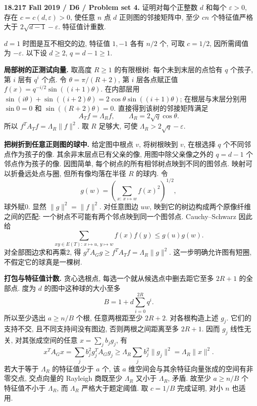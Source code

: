 \begin{exercise}\label{mit:18217-d6}
\textbf{18.217 Fall 2019 / D6 / Problem set 4.}
证明对每个正整数 $d$ 和每个 $\varepsilon>0$, 存在 $c=c(d,\varepsilon)>0$, 使任意 $n$ 点 $d$ 正则图的邻接矩阵中, 至少 $cn$ 个特征值严格大于 $2\sqrt{d-1}-\varepsilon$. 特征值计重数.
\end{exercise}
\begin{solution}
$d=1$ 时图是互不相交的边, 特征值 $1,-1$ 各有 $n/2$ 个, 可取 $c=1/2$, 因所需阈值为 $-\varepsilon$. 以下设 $d\ge2$, $q=d-1\ge1$.

\textbf{局部树的正测试向量.}
取高度 $R\ge1$ 的有限根树: 每个未到末层的点恰有 $q$ 个孩子, 第 $i$ 层有 $q^i$ 个点. 令 $\theta=\pi/(R+2)$, 第 $i$ 层各点赋正值
$f(x)=q^{-i/2}\sin((i+1)\theta)$.
在内部层用
$\sin(i\theta)+\sin((i+2)\theta)=2\cos\theta\sin((i+1)\theta)$;
在根层与末层分别用 $\sin0=0$ 和 $\sin((R+2)\theta)=0$. 直接得到该树的邻接矩阵满足
\[
A_Tf=\Lambda_R f,\qquad \Lambda_R=2\sqrt q\cos\theta.
\]
所以 $f^TA_Tf=\Lambda_R\|f\|^2$. 取 $R$ 足够大, 可使 $\Lambda_R>2\sqrt q-\varepsilon$.

\textbf{把树折到任意正则图的球中.}
给定图中根点 $v$, 将树根映到 $v$, 在根选择 $q$ 个不同邻点作为孩子的像. 其余非末层点已有父亲的像, 用图中除父亲像之外的 $q=d-1$ 个邻点作为孩子的像. 因图简单, 每个树点的所有相邻树点映到不同的图邻点. 映射可以折叠远处点与圈, 但所有像均落在半径 $R$ 的球内. 令
\[
g(w)=\left(\sum_{x:\,x\mapsto w}f(x)^2\right)^{1/2},
\]
球外赋0. 显然 $\|g\|^2=\|f\|^2$. 对任意图边 $uw$, 映到它的树边构成两个原像纤维之间的匹配: 一个树点不可能有两个邻点映到同一个图邻点. Cauchy--Schwarz 因此给
\[
\sum_{xy\in E(T):\,x\mapsto u,\,y\mapsto w}f(x)f(y)
\le g(u)g(w).
\]
对全部图边求和再乘2, 得
$g^TA_Gg\ge f^TA_Tf=\Lambda_R\|g\|^2$.
这一步明确允许图有短圈, 不假定它的球真是一棵树.

\textbf{打包与特征值计数.}
贪心选根点, 每选一个就从候选点中删去距它至多 $2R+1$ 的全部点. 度为 $d$ 的图中这种球的大小至多
\[
B=1+d\sum_{i=0}^{2R}q^i.
\]
所以至少选出 $a\ge n/B$ 个根, 任意两根距至少 $2R+2$. 对各根构造上述 $g_j$. 它们的支持不交, 且不同支持间没有图边, 否则两根之间距离至多 $2R+1$. 因而 $g_j$ 线性无关, 对其张成空间的任意 $x=\sum_jb_jg_j$, 有
\[
x^TA_Gx=\sum_jb_j^2g_j^TA_Gg_j
\ge\Lambda_R\sum_jb_j^2\|g_j\|^2
=\Lambda_R\|x\|^2.
\]
若大于等于 $\Lambda_R$ 的特征值少于 $a$ 个, 该 $a$ 维空间会与其余特征向量张成的空间有非零交点, 交点向量的 Rayleigh 商既至少 $\Lambda_R$ 又小于 $\Lambda_R$, 矛盾. 故至少 $a\ge n/B$ 个特征值不小于 $\Lambda_R$, 而 $\Lambda_R$ 严格大于题定阈值. 取 $c=1/B$ 完成证明, 对小 $n$ 也适用.
\end{solution}

